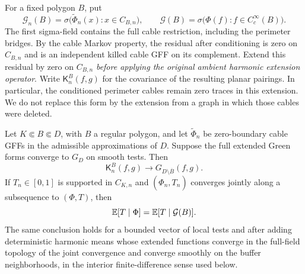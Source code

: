 For a fixed polygon \(B\), put
\[
 \mathcal G_n(B)=
 \sigma\bigl(\widetilde\Phi_n(x):x\in C_{B,n}\bigr),\qquad
 \mathcal G(B)=\sigma\bigl(\Phi(f):f\in C_c^\infty(B)\bigr).
\]
The first sigma-field contains the full cable restriction, including
the perimeter bridges. By the cable Markov property, the residual after
conditioning is zero on \(C_{B,n}\) and is an independent killed cable
GFF on its complement. Extend this residual by zero on \(C_{B,n}\)
\emph{before applying the original ambient harmonic extension operator}.
Write \(\mathsf K_n^B(f,g)\) for the covariance of the resulting planar
pairings. In particular, the conditioned perimeter cables remain zero
traces in this extension. We do not replace this form by the extension
from a graph in which those cables were deleted.

\begin{lemma}
\label{lem:reverse-buffer}
Let \(K\Subset B\Subset D\), with \(B\) a regular polygon, and let
\(\widetilde\Phi_n\) be zero-boundary cable GFFs in the admissible
approximations of \(D\). Suppose the full extended Green forms converge
to \(G_D\) on smooth tests. Then
\[
                    \mathsf K_n^B(f,g)
             \longrightarrow G_{D\setminus\overline B}(f,g).
\]
If \(T_n\in[0,1]\) is supported in \(C_{K,n}\) and
\((\widehat\Phi_n,T_n)\) converges jointly along a subsequence to
\((\Phi,T)\), then
\begin{equation}
       \mathbb E[T\mid\Phi]=\mathbb E[T\mid\mathcal G(B)].
 \label{eq:kernel-localization}
\end{equation}
The same conclusion holds for a bounded vector of local tests and after
adding deterministic harmonic means whose extended functions converge
in the full-field topology of the joint convergence and converge smoothly
on the buffer neighborhoods, in the interior finite-difference sense
used below.
\end{lemma}

